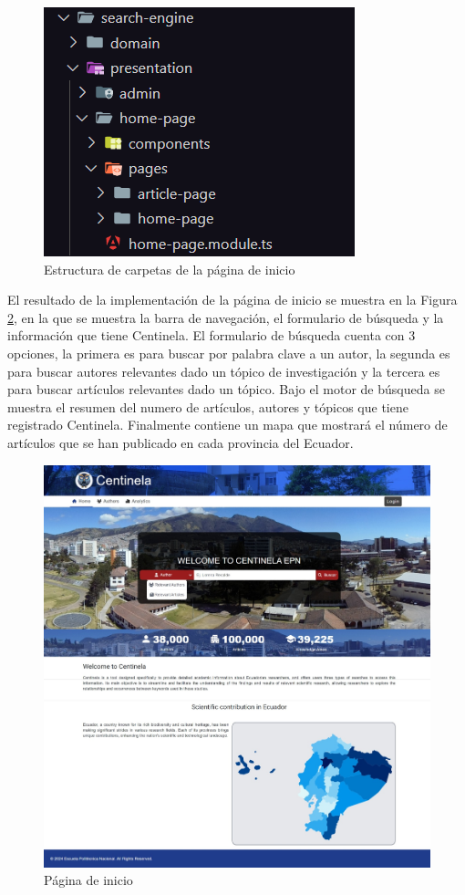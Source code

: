 \begin{figure}[H]
    \centering
    \includegraphics[scale=0.8]{../02Figures/02Chapter/Sprints/Sprint-1/home-page-ha.png}
    \caption{Estructura de carpetas de la página de inicio}
    \label{fig:hexagonal-architecture-home}
\end{figure}

El resultado de la implementación de la página de inicio se muestra en la Figura \ref{fig:home-page}, en la que se muestra la barra de navegación, el formulario de búsqueda y la información que tiene Centinela. El formulario de búsqueda cuenta con 3 opciones, 
la primera es para buscar por palabra clave a un autor, la segunda es para buscar autores relevantes dado un tópico de investigación y la tercera es para buscar artículos relevantes dado un tópico.
Bajo el motor de búsqueda se muestra el resumen del numero de artículos, autores y tópicos que tiene registrado Centinela.
Finalmente contiene un mapa que mostrará el número de artículos que se han publicado en cada provincia del Ecuador.
\begin{figure}[H]
    \centering
    \includegraphics[scale=0.160]{../02Figures/02Chapter/Sprints/Sprint-1/home-page.jpeg}
    \caption{Página de inicio}
    \label{fig:home-page}
\end{figure}

